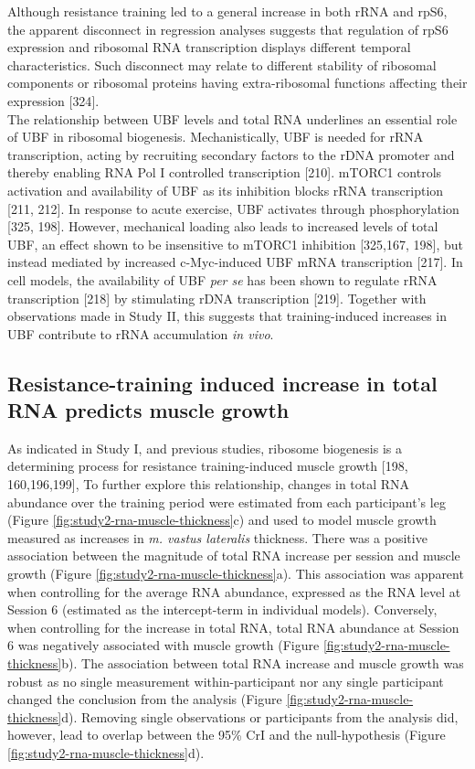 \documentclass[twoside,10pt]{gihclass} %
\begin{document}
Although resistance training led to a general increase in both rRNA and rpS6, the apparent disconnect in regression analyses suggests that regulation of rpS6 expression and ribosomal RNA transcription displays different temporal characteristics. Such disconnect may relate to different stability of ribosomal components or ribosomal proteins having extra-ribosomal functions affecting their expression
{[}324{]}.\\
The relationship between UBF levels and total RNA underlines an essential role of UBF in ribosomal biogenesis. Mechanistically, UBF is needed for rRNA transcription, acting by recruiting secondary factors to the rDNA promoter and thereby enabling RNA Pol I controlled transcription
{[}210{]}.
mTORC1 controls activation and availability of UBF as its inhibition blocks rRNA transcription
{[}211, 212{]}.
In response to acute exercise, UBF activates through phosphorylation
{[}325, 198{]}.
However, mechanical loading also leads to increased levels of total UBF, an effect shown to be insensitive to mTORC1 inhibition
{[}325,167, 198{]},
but instead mediated by increased c-Myc-induced UBF mRNA transcription {[}217{]}.
In cell models, the availability of UBF \emph{per se} has been shown to regulate rRNA transcription
{[}218{]} by stimulating rDNA transcription
{[}219{]}.
Together with observations made in Study II, this suggests that training-induced increases in UBF contribute to rRNA accumulation \emph{in vivo}.

\hypertarget{resistance-training-induced-increase-in-total-rna-predicts-muscle-growth}{%
\subsection{Resistance-training induced increase in total RNA predicts muscle growth}\label{resistance-training-induced-increase-in-total-rna-predicts-muscle-growth}}

As indicated in Study I, and previous studies, ribosome biogenesis is a determining process for resistance training-induced muscle growth
{[}198, 160,196,199{]},
To further explore this relationship, changes in total RNA abundance over the training period were estimated from each participant's leg (Figure \ref{fig:study2-rna-muscle-thickness}c) and used to model muscle growth measured as increases in \emph{m. vastus lateralis} thickness. There was a positive association between the magnitude of total RNA increase per session and muscle growth (Figure \ref{fig:study2-rna-muscle-thickness}a). This association was apparent when controlling for the average RNA abundance, expressed as the RNA level at Session 6 (estimated as the intercept-term in individual models). Conversely, when controlling for the increase in total RNA, total RNA abundance at Session 6 was negatively associated with muscle growth (Figure \ref{fig:study2-rna-muscle-thickness}b).
The association between total RNA increase and muscle growth was robust as no single measurement within-participant nor any single participant changed the conclusion from the analysis (Figure \ref{fig:study2-rna-muscle-thickness}d). Removing single observations or participants from the analysis did, however, lead to overlap between the 95\% CrI and the null-hypothesis (Figure \ref{fig:study2-rna-muscle-thickness}d).
\end{document}
